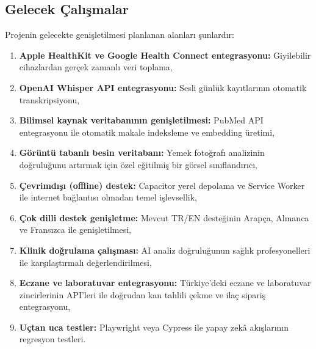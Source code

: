 \subsection{Gelecek Çalışmalar}

Projenin gelecekte genişletilmesi planlanan alanları şunlardır:

\begin{enumerate}
    \item \textbf{Apple HealthKit ve Google Health Connect entegrasyonu:} Giyilebilir cihazlardan gerçek zamanlı veri toplama,
    \item \textbf{OpenAI Whisper API entegrasyonu:} Sesli günlük kayıtlarının otomatik transkripsiyonu,
    \item \textbf{Bilimsel kaynak veritabanının genişletilmesi:} PubMed API entegrasyonu ile otomatik makale indeksleme ve embedding üretimi,
    \item \textbf{Görüntü tabanlı besin veritabanı:} Yemek fotoğrafı analizinin doğruluğunu artırmak için özel eğitilmiş bir görsel sınıflandırıcı,
    \item \textbf{Çevrimdışı (offline) destek:} Capacitor yerel depolama ve Service Worker ile internet bağlantısı olmadan temel işlevsellik,
    \item \textbf{Çok dilli destek genişletme:} Mevcut TR/EN desteğinin Arapça, Almanca ve Fransızca ile genişletilmesi,
    \item \textbf{Klinik doğrulama çalışması:} AI analiz doğruluğunun sağlık profesyonelleri ile karşılaştırmalı değerlendirilmesi,
    \item \textbf{Eczane ve laboratuvar entegrasyonu:} Türkiye'deki eczane ve laboratuvar zincirlerinin API'leri ile doğrudan kan tahlili çekme ve ilaç sipariş entegrasyonu,
    \item \textbf{Uçtan uca testler:} Playwright veya Cypress ile yapay zekâ akışlarının regresyon testleri.
\end{enumerate}
